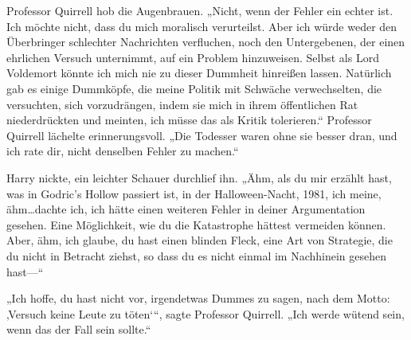 Professor Quirrell hob die Augenbrauen.
„Nicht, wenn der Fehler ein echter ist. Ich möchte nicht, dass du mich moralisch verurteilst. Aber ich würde weder den Überbringer schlechter Nachrichten verfluchen, noch den Untergebenen, der einen ehrlichen Versuch unternimmt, auf ein Problem hinzuweisen. Selbst als Lord Voldemort könnte ich mich nie zu dieser Dummheit hinreißen lassen. Natürlich gab es einige Dummköpfe, die meine Politik mit Schwäche verwechselten, die versuchten, sich vorzudrängen, indem sie mich in ihrem öffentlichen Rat niederdrückten und meinten, ich müsse das als Kritik tolerieren.“
Professor Quirrell lächelte erinnerungsvoll.
„Die Todesser waren ohne sie besser dran, und ich rate dir, nicht denselben Fehler zu machen.“

Harry nickte, ein leichter Schauer durchlief ihn.
„Ähm, als du mir erzählt hast, was in Godric’s Hollow passiert ist, in der Halloween-Nacht, 1981, ich meine, ähm…dachte ich, ich hätte einen weiteren Fehler in deiner Argumentation gesehen. Eine Möglichkeit, wie du die Katastrophe hättest vermeiden können. Aber, ähm, ich glaube, du hast einen blinden Fleck, eine Art von Strategie, die du nicht in Betracht ziehst, so dass du es nicht einmal im Nachhinein gesehen hast—“

„Ich hoffe, du hast nicht vor, irgendetwas Dummes zu sagen, nach dem Motto: ‚Versuch keine Leute zu töten‘“, sagte Professor Quirrell. „Ich werde wütend sein, wenn das der Fall sein sollte.“

